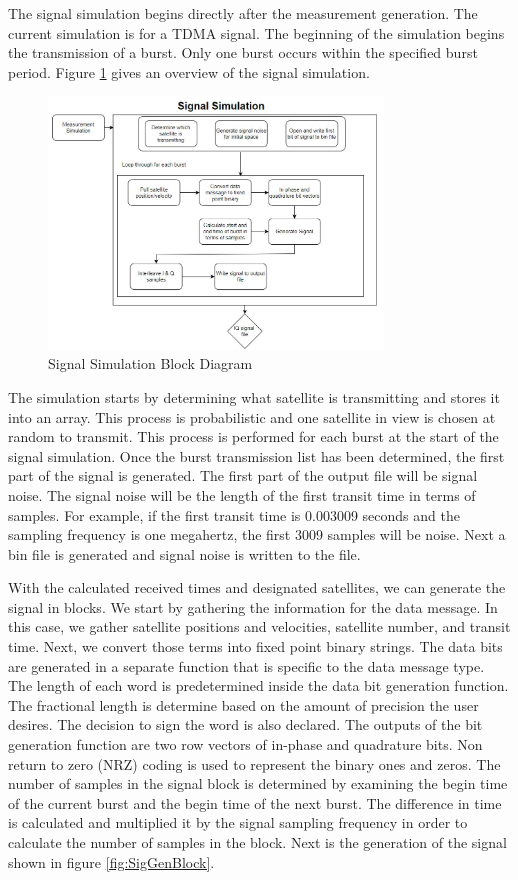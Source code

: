 \documentclass[12pt]{report}
\begin{document}
The signal simulation begins directly after the measurement generation. The current simulation is for a TDMA signal. The beginning of the simulation begins the transmission of a burst. Only one burst occurs within the specified burst period. Figure \ref{fig:SigSimBlock} gives an overview of the signal simulation.

\begin{figure}[h]
    \centering
    \includegraphics[width=3.5in]{SignalSimBlock}
    \caption{Signal Simulation Block Diagram}
    \label{fig:SigSimBlock}
\end{figure}



The simulation starts by determining what satellite is transmitting and stores it into an array. This process is probabilistic and one satellite in view is chosen at random to transmit. This process is performed for each burst at the start of the signal simulation. Once the burst transmission list has been determined, the first part of the signal is generated. The first part of the output file will be signal noise. The signal noise will be the length of the first transit time in terms of samples. For example, if the first transit time is 0.003009 seconds and the sampling frequency is one megahertz, the first 3009 samples will be noise. Next a bin file is generated and signal noise is written to the file. 

With the calculated received times and designated satellites, we can generate the signal in blocks. We start by gathering the information for the data message. In this case, we gather satellite positions and velocities, satellite number, and transit time. Next, we convert those terms into fixed point binary strings. The data bits are generated in a separate function that is specific to the data message type. The length of each word is predetermined inside the data bit generation function.  The fractional length is determine based on the amount of precision the user desires. The decision to sign the word is also declared.  The outputs of the bit generation function are two row vectors of in-phase and quadrature bits. Non return to zero (NRZ) coding is used to represent the binary ones and zeros. The number of samples in the signal block is determined by examining the begin time of the current burst and the begin time of the next burst. The difference in time is calculated and multiplied it by the signal sampling frequency in order to calculate the number of samples in the block. Next is the generation of the signal shown in figure \ref{fig:SigGenBlock}. 
\end{document}

